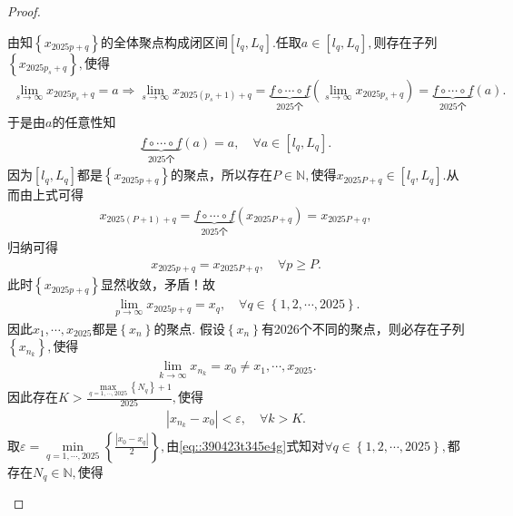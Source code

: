 \documentclass[../../main.tex]{subfiles}
\begin{document}
\begin{proof}
\begin{enumerate}
由知$\left\{ x_{2025p+q} \right\}$的全体聚点构成闭区间$\left[ l_q,L_q \right].$任取$a\in \left[ l_q,L_q \right],$则存在子列$\left\{ x_{2025p_s+q} \right\},$使得
\begin{align*}
\underset{s\rightarrow \infty}{\lim}x_{2025p_s+q}=a\Longrightarrow \underset{s\rightarrow \infty}{\lim}x_{2025\left( p_s+1 \right) +q}=\underset{2025\text{个}}{\underbrace{f\circ  \cdots \circ  f}}\left( \underset{s\rightarrow \infty}{\lim}x_{2025p_s+q} \right) =\underset{2025\text{个}}{\underbrace{f\circ  \cdots \circ  f}}\left( a \right).
\end{align*}
于是由$a$的任意性知
\begin{align*}
\underset{2025\text{个}}{\underbrace{f\circ  \cdots \circ  f}}\left( a \right) =a,\quad \forall a\in \left[ l_q,L_q \right].
\end{align*}
因为$\left[ l_q,L_q \right]$都是$\left\{ x_{2025p+q} \right\}$的聚点，所以存在$P\in \mathbb{N},$使得$x_{2025P+q}\in \left[ l_q,L_q \right].$从而由上式可得
\begin{align*}
x_{2025\left( P+1 \right) +q}=\underset{2025\text{个}}{\underbrace{f\circ  \cdots \circ  f}}\left( x_{2025P+q} \right) =x_{2025P+q},
\end{align*}
归纳可得
\begin{align*}
x_{2025p+q}=x_{2025P+q},\quad \forall p\geqslant P.
\end{align*}
此时$\left\{ x_{2025p+q} \right\}$显然收敛，矛盾！故
\begin{align}\label{eq::390423t345e4g}
\underset{p\rightarrow \infty}{\lim}x_{2025p+q}=x_q,\quad \forall q\in \left\{ 1,2,\cdots ,2025 \right\}.
\end{align}
因此$x_1,\cdots ,x_{2025}$都是$\left\{ x_n \right\}$的聚点.
假设$\left\{ x_n \right\}$有2026个不同的聚点，则必存在子列$\left\{ x_{n_k} \right\},$使得
\begin{align*}
\underset{k\rightarrow \infty}{\lim}x_{n_k}=x_0\ne x_1,\cdots ,x_{2025}.
\end{align*}
因此存在$K>\frac{\underset{q=1,\cdots ,2025}{\max}\left\{ N_q \right\} +1}{2025},$使得
\begin{align}
\left| x_{n_k}-x_0 \right|<\varepsilon ,\quad \forall k>K.\label{eq:155.464tw53t3453453532}
\end{align}
取$\varepsilon =\underset{q=1,\cdots ,2025}{\min}\left\{ \frac{\left| x_0-x_q \right|}{2} \right\},$由\eqref{eq::390423t345e4g}式知对$\forall q\in \left\{ 1,2,\cdots ,2025 \right\},$都存在$N_q\in \mathbb{N},$使得

\end{enumerate}
\end{proof}
\end{document}
